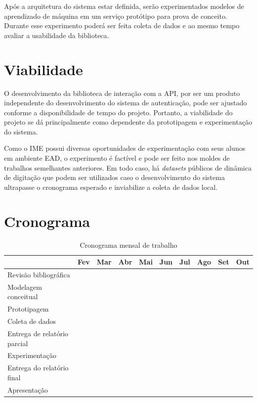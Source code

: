 \documentclass[pfc]{imetex}
\begin{document}
Após a arquitetura do sistema estar definida, serão experimentados modelos de aprendizado de máquina em um serviço protótipo para prova de conceito. Durante esse experimento poderá ser feita coleta de dados e ao mesmo tempo avaliar a usabilidade da biblioteca.

\section{Viabilidade}
O desenvolvimento da biblioteca de interação com a API, por ser um  produto independente do desenvolvimento do sistema de autenticação, pode ser ajustado conforme a disponibilidade de tempo do projeto. Portanto, a viabilidade do projeto se dá principalmente como dependente da prototipagem e experimentação do sistema.

Como o IME possui diversas oportunidades de experimentação com seus alunos em ambiente EAD, o experimento é factível e pode ser feito nos moldes de trabalhos semelhantes anteriores. Em todo caso, há \textit{datasets} públicos de dinâmica de digitação que podem ser utilizados caso o desenvolvimento do sistema ultrapasse o cronograma esperado e inviabilize a coleta de dados local.

\section{Cronograma}
\begin{table}[htb]
\begin{tabular}{|l|c|c|c|c|c|c|c|c|c|}
\hline
& Fev & Mar & Abr & Mai & Jun & Jul & Ago & Set & Out \\
\hline
Revisão bibliográfica &
\multicolumn{2}{c}{\cellcolor[gray]{0.5}} &
\multicolumn{6}{c}{} &
\\
\hline
Modelagem conceitual &
\multicolumn{1}{c}{} &
\multicolumn{3}{c}{\cellcolor[gray]{0.5}} &
\multicolumn{4}{c}{} &
\\
\hline
Prototipagem &
\multicolumn{2}{c}{} &
\multicolumn{3}{c}{\cellcolor[gray]{0.5}} &
\multicolumn{3}{c}{} &
\\
\hline
Coleta de dados &
\multicolumn{4}{c}{} &
\multicolumn{1}{c}{\cellcolor[gray]{0.5}} &
\multicolumn{3}{c}{} &
\\
\hline
Entrega de relatório parcial &
\multicolumn{3}{c}{} &
\multicolumn{1}{c}{\cellcolor[gray]{0.5}} &
\multicolumn{1}{c}{} &
\multicolumn{1}{c}{\cellcolor[gray]{0.5}} &
\multicolumn{2}{c}{} &
\\
\hline
Experimentação &
\multicolumn{5}{c}{} &
\multicolumn{2}{c}{\cellcolor[gray]{0.5}} &
\multicolumn{1}{c}{} &
\\
\hline
Entrega do relatório final &
\multicolumn{7}{c}{} &
\multicolumn{1}{c}{\cellcolor[gray]{0.5}} &
\\
\hline
Apresentação &
\multicolumn{8}{c}{} &
\multicolumn{1}{c}{\cellcolor[gray]{0.5}}
\\
\hline
\end{tabular}

\caption{Cronograma mensal de trabalho}
\end{table}
\end{document}
